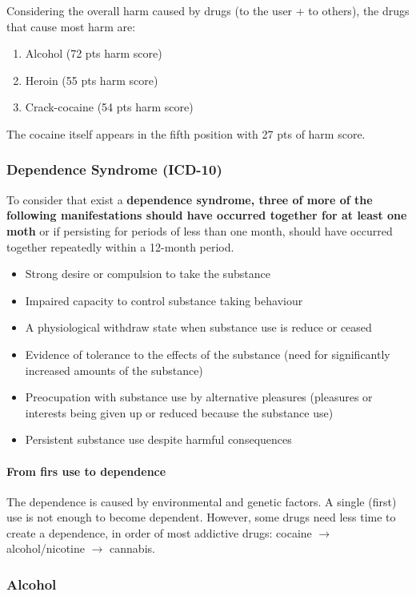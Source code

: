\documentclass[12pt,article,oneside,a4paper]{memoir}
\begin{document}
Considering the overall harm caused by drugs (to the user + to others), the
drugs that cause most harm are: 
\begin{enumerate}
\item Alcohol (72 pts harm score)
\item Heroin (55 pts harm score)
\item Crack-cocaine (54 pts harm score)
\end{enumerate}
The cocaine itself appears in the fifth position with 27 pts of harm score.

\subsubsection{Dependence Syndrome (ICD-10)} 
To consider that exist a \textbf{dependence syndrome, three of more of the
following manifestations should have occurred together for at least one moth}
or if persisting for periods of less than one month, should have occurred
together repeatedly within a 12-month period.

\begin{itemize}
\item Strong desire or compulsion to take the substance
\item Impaired capacity to control substance taking behaviour
\item A physiological withdraw state when substance use is reduce or ceased
\item Evidence of tolerance to the effects of the substance (need for
significantly increased amounts of the substance)
\item Preocupation with substance use by alternative pleasures (pleasures or
interests being given up or reduced because the substance use)
\item Persistent substance use despite harmful consequences
\end{itemize}

\paragraph{From firs use to dependence} 
The dependence is caused by environmental and genetic factors. A single (first)
use is not enough to become dependent.
However, some drugs need less time to create a dependence, in order of most
addictive drugs: cocaine $\rightarrow$ alcohol/nicotine $\rightarrow$ cannabis.

\subsubsection{Alcohol}
\end{document}
